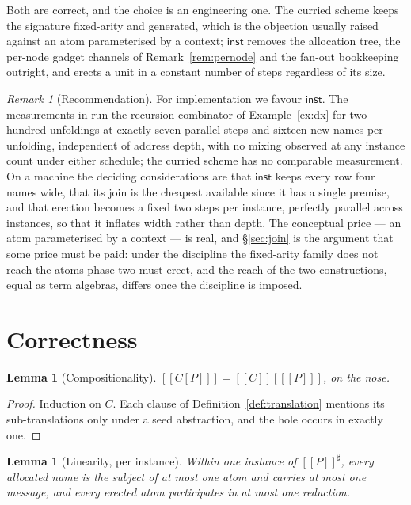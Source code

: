 \documentclass[11pt]{article}
\theoremstyle{plain}
\newtheorem{lemma}[theorem]{Lemma}
\theoremstyle{definition}
\theoremstyle{remark}
\newtheorem{remark}[theorem]{Remark}
\newcommand{\enc}[1]{[\![#1]\!]}
\newcommand{\inst}{\mathsf{inst}}
\begin{document}
Both are correct, and the choice is an engineering one. The curried scheme
keeps the signature fixed-arity and generated, which is the objection usually
raised against an atom parameterised by a context; $\inst$ removes the
allocation tree, the per-node gadget channels of
Remark~\ref{rem:pernode} and the fan-out bookkeeping outright, and erects a
unit in a constant number of steps regardless of its size.

\begin{remark}[Recommendation]
\label{rem:recommend}
For implementation we favour $\inst$. The measurements in
\cite[\S14]{rhocombmat} run the recursion combinator of
Example~\ref{ex:dx} for two hundred unfoldings at exactly seven parallel
steps and sixteen new names per unfolding, independent of address depth, with
no mixing observed at any instance count under either schedule; the curried
scheme has no comparable measurement. On a machine the deciding
considerations are that $\inst$ keeps every row four names wide, that its
join is the cheapest available since it has a single premise, and that
erection becomes a fixed two steps per instance, perfectly parallel across
instances, so that it inflates width rather than depth. The conceptual price
--- an atom parameterised by a context --- is real, and
\S\ref{sec:join} is the argument that some price must be paid: under the
discipline the fixed-arity family does not reach the atoms phase two must
erect, and the reach of the two constructions, equal as term algebras,
differs once the discipline is imposed.
\end{remark}

\section{Correctness}
\label{sec:correct}

\begin{lemma}[Compositionality]
\label{lem:compositional}
$\enc{C[P]} = \enc{C}[\enc{P}]$, on the nose.
\end{lemma}

\begin{proof}
Induction on $C$. Each clause of Definition~\ref{def:translation} mentions
its sub-translations only under a seed abstraction, and the hole occurs in
exactly one.
\end{proof}

\begin{lemma}[Linearity, per instance]
\label{lem:linearity}
Within one instance of $\enc{P}^{\sharp}$, every allocated name is the
subject of at most one atom and carries at most one message, and every
erected atom participates in at most one reduction.
\end{lemma}
\end{document}

